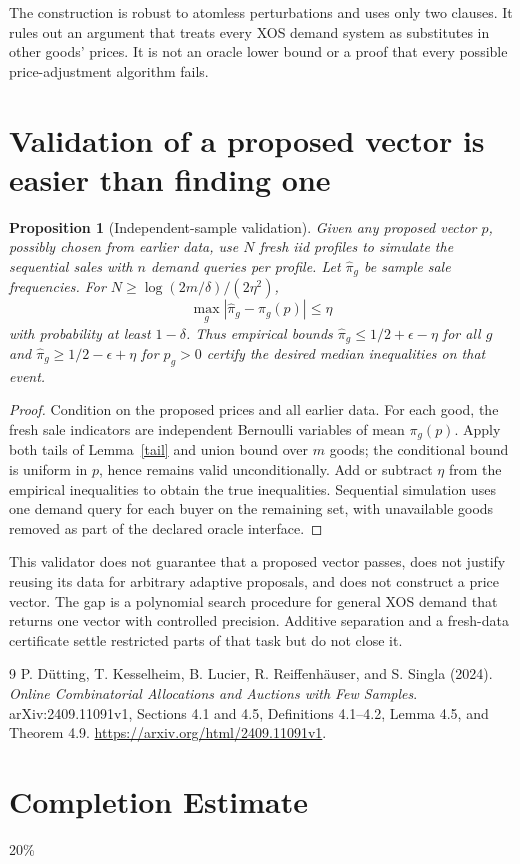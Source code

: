 \documentclass[11pt]{article}
\newtheorem{proposition}[theorem]{Proposition}
\theoremstyle{remark}
\begin{document}
The construction is robust to atomless perturbations and uses only two
clauses. It rules out an argument that treats every XOS demand system
as substitutes in other goods' prices. It is not an oracle lower bound
or a proof that every possible price-adjustment algorithm fails.

\section{Validation of a proposed vector is easier than finding one}
\begin{proposition}[Independent-sample validation]
Given any proposed vector $p$, possibly chosen from earlier data, use
$N$ fresh iid profiles to simulate the sequential sales with $n$ demand
queries per profile. Let $\widehat\pi_g$ be sample sale frequencies.
For $N\geq\log(2m/\delta)/(2\eta^2)$,
\[
 \max_g|\widehat\pi_g-\pi_g(p)|\leq\eta
\]
with probability at least $1-\delta$. Thus empirical bounds
$\widehat\pi_g\leq1/2+\epsilon-\eta$ for all $g$ and
$\widehat\pi_g\geq1/2-\epsilon+\eta$ for $p_g>0$ certify the desired
median inequalities on that event.
\end{proposition}
\begin{proof}
Condition on the proposed prices and all earlier data. For each good,
the fresh sale indicators are independent Bernoulli variables of mean
$\pi_g(p)$. Apply both tails of Lemma~\ref{tail} and union bound over
$m$ goods; the conditional bound is uniform in $p$, hence remains valid
unconditionally. Add or subtract $\eta$ from the empirical inequalities
to obtain the true inequalities. Sequential simulation uses one demand
query for each buyer on the remaining set, with unavailable goods
removed as part of the declared oracle interface.
\end{proof}

This validator does not guarantee that a proposed vector passes, does
not justify reusing its data for arbitrary adaptive proposals, and
does not construct a price vector. The gap is a polynomial search
procedure for general XOS demand that returns one vector with controlled
precision. Additive separation and a fresh-data certificate settle
restricted parts of that task but do not close it.
\begin{thebibliography}{9}
 P. D\"utting, T. Kesselheim, B. Lucier,
R. Reiffenh\"auser, and S. Singla (2024).
\emph{Online Combinatorial Allocations and Auctions with Few Samples}.
arXiv:2409.11091v1, Sections 4.1 and 4.5,
Definitions 4.1--4.2, Lemma 4.5, and Theorem 4.9.
\url{https://arxiv.org/html/2409.11091v1}.
\end{thebibliography}

\section{Completion Estimate}
20\%
\end{document}
